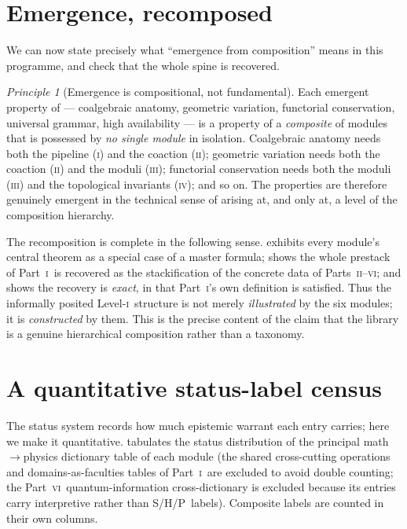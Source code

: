 \documentclass[12pt]{article}
\theoremstyle{definition}
\theoremstyle{remark}
\newtheorem{principle}[theorem]{Principle}
\newcommand{\Sstat}{\textsf{S}}
\newcommand{\Hstat}{\textsf{H}}
\newcommand{\Pstat}{\textsf{P}}
\newcommand{\PI}{\textsc{i}}
\newcommand{\PII}{\textsc{ii}}
\newcommand{\PIII}{\textsc{iii}}
\newcommand{\PIV}{\textsc{iv}}
\newcommand{\PVI}{\textsc{vi}}
\begin{document}
\section{Emergence, recomposed}
\label{sec:emergence}

We can now state precisely what ``emergence from composition'' means in this
programme, and check that the whole spine is recovered.

\begin{principle}[Emergence is compositional, not fundamental]
\label{prin:emerge}
Each emergent property of  --- coalgebraic anatomy, geometric
variation, functorial conservation, universal grammar, high availability --- is a
property of a \emph{composite} of modules that is possessed by \emph{no single module}
in isolation.  Coalgebraic anatomy needs both the pipeline (\PI) and the coaction
(\PII); geometric variation needs both the coaction (\PII) and the moduli (\PIII);
functorial conservation needs both the moduli (\PIII) and the topological invariants
(\PIV); and so on.  The properties are therefore genuinely emergent in the technical
sense of arising at, and only at, a level of the composition hierarchy.
\end{principle}

The recomposition is complete in the following sense.   exhibits
every module's central theorem as a special case of a master formula; 
shows the whole prestack of Part~\PI\ is recovered as the stackification of the concrete
data of Parts~\PII--\PVI; and  shows the recovery is \emph{exact}, in
that Part~\PI's own definition is satisfied.  Thus the informally posited Level-\PI\
structure is not merely \emph{illustrated} by the six modules; it is
\emph{constructed} by them.  This is the precise content of the claim that the library
is a genuine hierarchical composition rather than a taxonomy.

\section{A quantitative status-label census}
\label{sec:status}

The status system records how much epistemic warrant each entry carries; here we make it
quantitative.  \Cref{tab:census} tabulates the status distribution of the principal
math$\to$physics dictionary table of each module (the shared cross-cutting operations
and domains-as-faculties tables of Part~\PI\ are excluded to avoid double counting; the
Part~\PVI\ quantum-information cross-dictionary is excluded because its entries carry
interpretive rather than \Sstat/\Hstat/\Pstat\ labels).  Composite labels are counted
in their own columns.
\end{document}
